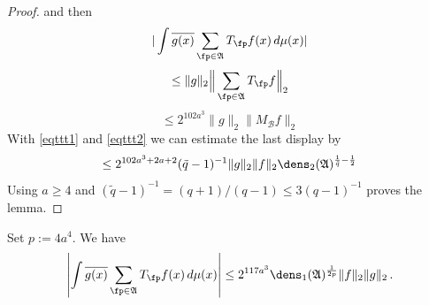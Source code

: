 \begin{proof}
and then 
 \begin{equation}
     |\int \overline{g(x)} \sum_{\fp \in \mathfrak{A}} T_{\fp} f(x)\, d\mu(x)|
\end{equation}
 \begin{equation}
     \le \|g\|_2 \Big\| \sum_{\fp \in \mathfrak{A}} T_{\fp} f \Big\|_2
\end{equation}
 \begin{equation}
     \le 2^{102a^3}\|g\|_2 \| M_{\mathcal{B}}f \|_2
\end{equation}
With \eqref{eqttt1} and
\eqref{eqttt2} we can estimate the last display by
\begin{equation}
    \le 2^{102a^3+2a+2}(\tilde{q}-1)^{-1} \|g\|_2 \|f\|_2\dens_2(\mathfrak{A})^{\frac 1{\tilde{q}}-\frac 12}
\end{equation}
Using $a\ge 4$ and
$(\tilde q - 1)^{-1} = (q+1)/(q-1) \le 3(q-1)^{-1}$
proves the lemma.
\end{proof}


\begin{lemma}\label{dens1-antichain}
    \leanok
Set $p:=4a^4$. We have
    \begin{equation}\label{eqttt3}
  \left|\int \overline{g(x)} \sum_{\fp \in \mathfrak{A}} T_{\fp} f(x)\, d\mu(x)\right|\le
   2^{117a^3}\dens_1(\mathfrak{A})^{\frac 1{2p}} \|f\|_2\|g\|_2\,.
\end{equation}
\end{lemma}

